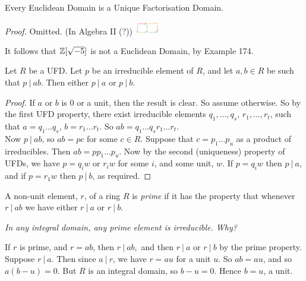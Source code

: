 \documentclass[twoside]{scrartcl}
\begin{document}
  
  
  \begin{theorem} Every Euclidean Domain is a Unique Factorisation Domain. %
  \end{theorem}

   \textit{Proof.} Omitted. (In Algebra II (?)) \includegraphics[width=0.08\textwidth]{al2.jpg} 

It follows that $\mathbb{Z}[\sqrt{-5}]$ is not a Euclidean Domain, by Example 174.


\begin{proposition} Let $R$ be a UFD. Let $p$ be an irreducible element of $R$, and let $a,b\in R$ be such that $p ~|~ ab$. Then either $p~|~ a$ or $p~|~ b$.	
\end{proposition}

\begin{proof}
If $a$ or $b$ is $0$ or a unit, then the result is clear. So assume otherwise. So by the first UFD property, there exist irreducible elements $q_1,\dots,q_s$, $r_1,\dots,r_t$, such that $a = q_1\dots q_s$, $b= r_1\dots r_t.$ So $ab = q_1\dots q_s r_1 \dots r_t$.\vspace*{5pt}\\ Now $p~|~ ab$, so $ab = pc$ for some $c \in R$. Suppose that $c = p_1\dots p_u$ as a product of irreducibles. Then $ab = pp_1\dots p_u$. Now by the second (uniqueness) property of UFDs, we have $p = q_iw$ or $r_i w$ for some $i$, and some unit, $w$. If $p = q_iw$ then $p~|~ a$, and if $p = r_1w$ then $p ~|~b$, as required.
\end{proof}

\begin{definition} A non-unit element, $r$, of a ring $R$ is \emph{prime} if it has the property that whenever $r ~|~ab$ we have either $r~|~ a$ or $r~|~b$.	
\end{definition}\vspace*{5pt}

 \textit{In any integral domain, any prime element is irreducible. Why?}

If $r$ is prime, and $r = ab$, then $r ~|~ ab,$ and then $r~|~ a$ or $r~|~b$ by the prime property. Suppose $r~|~a$. Then since $a ~|~ r$, we have $r = au$ for a unit $u$. So $ab = au$, and so $a(b-u) = 0$. But $R$ is an integral domain, so $b - u =0$. Hence $b = u$, a unit.
\end{document}
